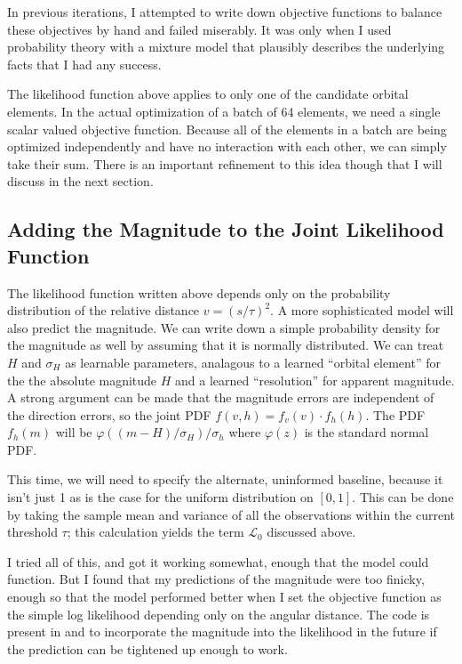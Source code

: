 In previous iterations, I attempted to write down objective functions to balance these objectives by hand and failed miserably.
It was only when I used probability theory with a mixture model that plausibly describes the underlying facts that I had any success.

The likelihood function above applies to only one of the candidate orbital elements.
In the actual optimization of a batch of 64 elements, we need a single scalar valued objective function.
Because all of the elements in a batch are being optimized independently and have no interaction with each other, we can simply take their sum.
There is an important refinement to this idea though that I will discuss in the next section.

\subsection{Adding the Magnitude to the Joint Likelihood Function}
The likelihood function written above depends only on the probability distribution of the relative distance $v = (s/\tau)^2$.
A more sophisticated model will also predict the magnitude.
We can write down a simple probability density for the magnitude as well by assuming that it is normally distributed.
We can treat $H$ and $\sigma_{H}$ as learnable parameters, analagous to a learned ``orbital element'' for the the absolute magnitude $H$
and a learned ``resolution'' for apparent magnitude.
A strong argument can be made that the magnitude errors are independent of the direction errors, 
so the joint PDF $f(v, h) = f_{v}(v) \cdot f_h(h)$.
The PDF $f_h(m)$ will be $\varphi( (m - H) / \sigma_H) / \sigma_h$ where $\varphi(z)$ is the standard normal PDF.

This time, we will need to specify the alternate, uninformed baseline, because it isn't just 1 as is the case for the uniform distribution on $[0,1]$.
This can be done by taking the sample mean and variance of all the observations within the current threshold $\tau$;
this calculation yields the term $\mathcal{L}_0$ discussed above.

I tried all of this, and got it working somewhat, enough that the model could function.
But I found that my predictions of the magnitude were too finicky, enough so that the model performed better when 
I set the objective function as the simple log likelihood depending only on the angular distance.
The code is present in  and  to incorporate the magnitude 
into the likelihood in the future if the prediction can be tightened up enough to work.

